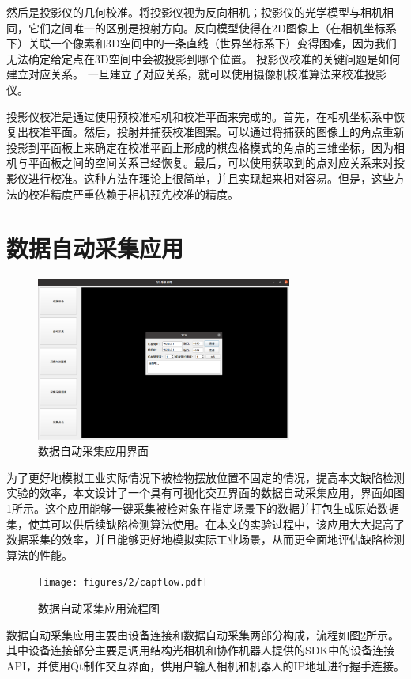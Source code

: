 然后是投影仪的几何校准。将投影仪视为反向相机；投影仪的光学模型与相机相同，它们之间唯一的区别是投射方向。反向模型使得在2D图像上（在相机坐标系下）关联一个像素和3D空间中的一条直线（世界坐标系下）变得困难，因为我们无法确定给定点在3D空间中会被投影到哪个位置。 投影仪校准的关键问题是如何建立对应关系。 一旦建立了对应关系，就可以使用摄像机校准算法来校准投影仪。

投影仪校准是通过使用预校准相机和校准平面来完成的。首先，在相机坐标系中恢复出校准平面。然后，投射并捕获校准图案。可以通过将捕获的图像上的角点重新投影到平面板上来确定在校准平面上形成的棋盘格模式的角点的三维坐标，因为相机与平面板之间的空间关系已经恢复。最后，可以使用获取到的点对应关系来对投影仪进行校准。这种方法在理论上很简单，并且实现起来相对容易。但是，这些方法的校准精度严重依赖于相机预先校准的精度。

\section{数据自动采集应用}
\begin{figure}[htbp]
  \centering
  \includegraphics[width=0.75\textwidth]{figures/2/application.png}
  \caption{数据自动采集应用界面}\label{fig:application}
\end{figure}
为了更好地模拟工业实际情况下被检物摆放位置不固定的情况，提高本文缺陷检测实验的效率，本文设计了一个具有可视化交互界面的数据自动采集应用，界面如图\ref{fig:application}所示。这个应用能够一键采集被检对象在指定场景下的数据并打包生成原始数据集，使其可以供后续缺陷检测算法使用。在本文的实验过程中，该应用大大提高了数据采集的效率，并且能够更好地模拟实际工业场景，从而更全面地评估缺陷检测算法的性能。

\begin{figure}[htbp]
  \centering
  \texttt{[image: figures/2/capflow.pdf]}
  \caption{数据自动采集应用流程图}\label{fig:capflow}
\end{figure}

数据自动采集应用主要由设备连接和数据自动采集两部分构成，流程如图\ref{fig:capflow}所示。其中设备连接部分主要是调用结构光相机和协作机器人提供的SDK中的设备连接API，并使用Qt制作交互界面，供用户输入相机和机器人的IP地址进行握手连接。

